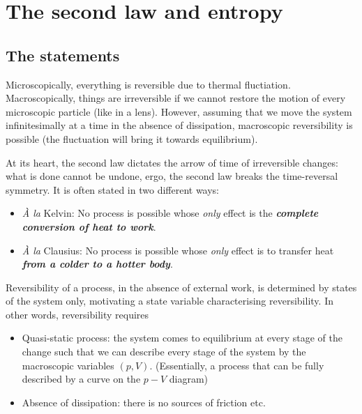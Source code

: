 \documentclass{article}
\theoremstyle{nonumberplain}
\begin{document}
\section{The second law and entropy}
\subsection{The statements}
Microscopically, everything is reversible due to thermal fluctiation. Macroscopically, things are irreversible if we cannot restore the motion of every microscopic particle (like in a lens). However, assuming that we move the system infinitesimally at a time in the absence of dissipation, macroscopic reversibility is possible (the fluctuation will bring it towards equilibrium). 

At its heart, the second law dictates the arrow of time of irreversible changes: what is done cannot be undone, ergo, the second law breaks the time-reversal symmetry. It is often stated in two different ways: 

\begin{itemize}
    \item \textit{\`{A} la} Kelvin: No process is possible whose \textit{only} effect is the \textit{\textbf{complete conversion of heat to work}}.
    \item  \textit{\`{A} la} Clausius: No process is possible whose \textit{only} effect is to transfer heat \textit{\textbf{from a colder to a hotter body}}. 
\end{itemize}


Reversibility of a process, in the absence of external work, is determined by states of the system only, motivating a state variable characterising reversibility. In other words, reversibility requires
\begin{itemize}
    \item Quasi-static process: the system comes to equilibrium at every stage of the change such that we can describe every stage of the system by the macroscopic variables $(p,V).$ (Essentially, a process that can be fully described by a curve on the $p-V$ diagram)
    \item Absence of dissipation: there is no sources of friction etc. 
\end{itemize}
\end{document}
